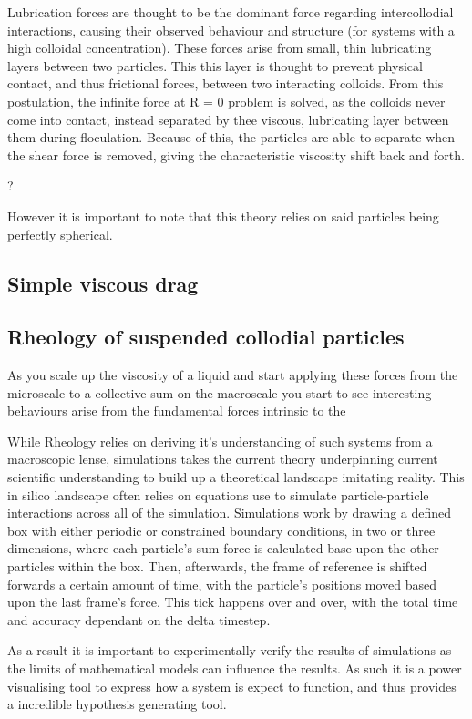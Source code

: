 Lubrication forces are thought to be the dominant force regarding intercollodial interactions, causing their observed behaviour and structure (for systems with a high colloidal concentration). These forces arise from small, thin lubricating layers between two particles. This this layer is thought to prevent physical contact, and thus frictional forces, between two interacting colloids. From this postulation, the infinite force at R = 0 problem is solved, as the colloids never come into contact, instead separated by thee viscous, lubricating layer between them during floculation. Because of this, the particles are able to separate when the shear force is removed, giving the characteristic viscosity shift back and forth.

?


However it is important to note that this theory relies on said particles being perfectly spherical.

\subsection{Simple viscous drag}
    


    
\subsection{Rheology of suspended collodial particles}

As you scale up the viscosity of a liquid and start applying these forces from the microscale to a collective sum on the macroscale you start to see interesting behaviours arise from the fundamental forces intrinsic to the 


 
 While Rheology relies on deriving it's understanding of such systems from a macroscopic lense, simulations takes the current theory underpinning current scientific understanding to build up a theoretical landscape imitating reality. This in silico landscape often relies on equations use to simulate particle-particle interactions across all of the simulation. Simulations work by drawing a defined box with either periodic or constrained boundary conditions, in two or three dimensions, where each particle's sum force is calculated base upon the other particles within the box. Then, afterwards, the frame of reference is shifted forwards a certain amount of time, with the particle's positions moved based upon the last frame's force. This tick happens over and over, with the total time and accuracy dependant on the delta timestep.\cite{foss_brady_2000}
 
As a result it is important to experimentally verify the results of simulations as the limits of mathematical models can influence the results. As such it is a power visualising tool to express how a system is expect to function, and thus provides a incredible hypothesis generating tool.

\newpage




